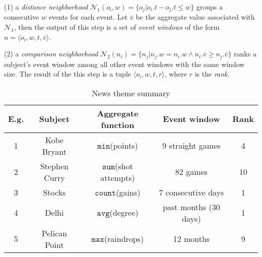 (1) a \emph{distance neighborhood} $\mathcal{N}_1(o_i,w)=\{o_j | o_i.t - o_j.t \leq w \}$ groups a consecutive $w$ events for each event. Let $\overline{v}$ be the aggregate value associated with $\mathcal{N}_1$, then the output of this step is a set of \emph{event windows} of the form  $n=\langle o_i, w, t, \overline{v} \rangle$.

(2) a \emph{comparison neighborhood} $\mathcal{N}_2(n_i) = \{n_j | n_j.w = n_i.w \wedge n_i.\overline{v} \geq n_j.\overline{v} \}$ ranks a subject's event window among all other event windows with the same window size. The result of the this step is a tuple $\langle o_i, w, t, r \rangle$, where $r$ is the \emph{rank}.





\begin{table}[h]
\centering
\begin{tabular}{|c|c|c|c|c|}
\hline
\textbf{E.g.} & \textbf{Subject} & \textbf{Aggregate function} & \textbf{Event window} & \textbf{Rank} \\
\hline
1 & Kobe Bryant &$\mathtt{min}$(points) & 9 straight games & 4 \\
\hline
2 & Stephen Curry &$\mathtt{sum}$(shot attempts) & 82 games & 10 \\
\hline
3 & Stocks &$\mathtt{count}$(gains) & 7 consecutive days & 1 \\
\hline
4 & Delhi &$\mathtt{avg}$(degree) & past months (30 days) & 1 \\
\hline
5 & Pelican Point &$\mathtt{max}$(raindrops) & 12 months & 9 \\
\hline
\end{tabular}
\caption{News theme summary}
\label{tbl:news-example}
\end{table}

